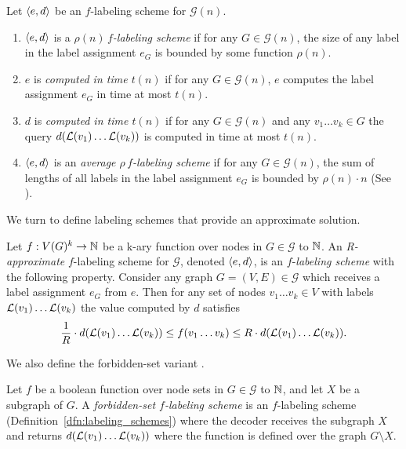 \begin{definition}
	Let  $\left \langle e,d \right \rangle $ be an $f$-labeling scheme  for  $\mathcal{G}(n)$.
	\begin{enumerate}
		\item   $\left \langle e,d \right \rangle $  is a \emph{$\rho(n) \, f$-labeling scheme} if  for  any $G \in \mathcal{G}(n)$,  the size  of any label in the  label assignment $e_G$  is bounded by some function $\rho(n)$. 
		\item $e$  is  \emph{computed in time $t(n)$} if for any $G \in \mathcal{G}(n)$, $e$ computes the label assignment $e_G$  in time at most $t(n)$. 
		\item  $d$ is  \emph{computed  in time $t(n)$}  if for any $G \in \mathcal{G}(n)$  and any $v_1\dots v_k \in G$  the query $d( \mathcal{L}(v_1)\dots  \mathcal{L}(v_k))$ is computed in time at most $t(n)$.
				\item   $\left \langle e,d \right \rangle $  is an \emph{average $\rho \, f$-labeling scheme}  if for  any  $G \in \mathcal{G}(n)$,  the sum of lengths of all labels in the  label assignment $e_G$  is bounded by $\rho(n) \cdot n$ (See \cite{Kano07}). 
	\end{enumerate}

\end{definition}


We turn to define labeling schemes that provide an approximate solution.
\begin{definition} \label{dfn:approx-label}
Let $f : V(G)^k  \rightarrow  \mathbb{N}$ be a k-ary function  over nodes in  $G \in \mathcal{G}$ to $ \mathbb{N}$.
An \emph{R-approximate}  $f$-labeling scheme for $\mathcal{G}$, denoted  $\left \langle e,d \right \rangle $, is an $f$-\emph{labeling scheme} with the following property.
Consider any graph $G=(V,E) \in \mathcal{G}$ which receives a label assignment $e_G$ from $e$. Then for any set of nodes $v_1\dots v_k\in V$ with labels  $ \mathcal{L}(v_1)\dots  \mathcal{L}(v_k) $ the value computed by $d$ satisfies 
\[ \frac{1}{R} \cdot d( \mathcal{L}(v_1)\dots  \mathcal{L}(v_k)) \leq  f(v_1\dots v_k) \leq {R} \cdot d( \mathcal{L}(v_1)\dots  \mathcal{L}(v_k)).   \]
\end{definition} 

We also define the forbidden-set variant \cite{courcelle2007forbidden}.
\begin{definition}\label{dfn:forbidden}
				Let  $f$ be a boolean function over node sets  in  $G \in \mathcal{G}$ to $ \mathbb{N}$, and let $X$ be a subgraph of $G$.
				 A \emph{forbidden-set $f$-labeling scheme } is an $f$-labeling scheme (Definition~\ref{dfn:labeling_schemes})  where the decoder receives the subgraph $X$ and returns $d( \mathcal{L}(v_1) \dots  \mathcal{L}(v_k))$ where the function is defined over the graph $G \setminus X$.
			\end{definition}


